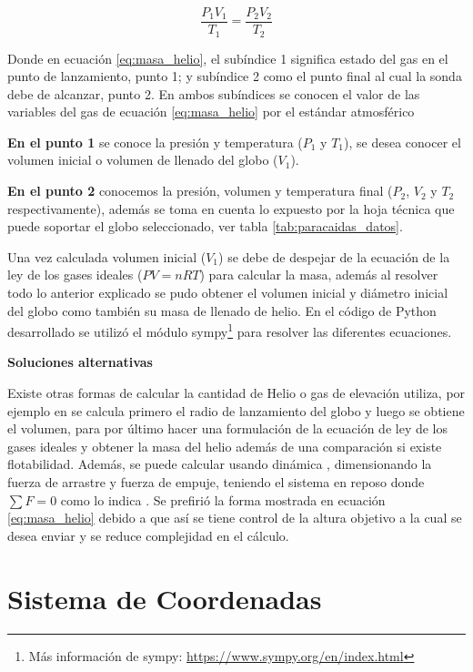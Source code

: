 \begin{equation}
    \label{eq:masa_helio}
    \frac{P_{1} V_{1}}{ T_{1} } = \frac{P_{2} V_{2}}{ T_{2} }
\end{equation}


Donde en ecuación \ref{eq:masa_helio}, el subíndice 1 significa estado del gas en el punto de lanzamiento, punto 1; y subíndice 2 como el punto final al cual la sonda debe de alcanzar, punto 2. En ambos subíndices se conocen el valor de las variables del gas de ecuación \ref{eq:masa_helio} por el estándar  atmosférico \cite{isa_1976}

\textbf{En el punto 1} se conoce la presión y temperatura ($P_{1}$ y $T_{1}$), se desea conocer el volumen inicial o volumen de llenado del globo ($V_{1}$).

\textbf{En el punto 2} conocemos la presión, volumen y temperatura final ($P_{2}$, $V_{2}$ y $T_{2}$ respectivamente), además se toma en cuenta lo expuesto por la hoja técnica que puede soportar el globo seleccionado, ver tabla \ref{tab:paracaidas_datos}. 

Una vez calculada volumen inicial ($V_{1}$) se debe de despejar de la ecuación de la ley de los gases ideales ($PV = nRT$) para calcular la masa, además al resolver todo lo anterior explicado se pudo obtener el volumen inicial y diámetro inicial del globo como también su masa de llenado de helio. En el código de Python desarrollado se utilizó el módulo sympy\footnote{Más información de sympy: \url{https://www.sympy.org/en/index.html}} para resolver las diferentes ecuaciones. 

\textbf{Soluciones alternativas}

Existe otras formas de calcular la cantidad de Helio o gas de elevación utiliza, por ejemplo  en \cite{spain_simulador} se calcula primero el radio de lanzamiento del globo y  luego se obtiene el volumen, para por último hacer una formulación de la ecuación de ley de los gases ideales y obtener la masa del helio además de una comparación si existe flotabilidad. Además, se puede calcular usando dinámica \cite{libro_dinamica_beer},  dimensionando la fuerza de arrastre y fuerza de empuje, teniendo el sistema en reposo donde $\sum F = 0$  como lo indica \cite{lsoda, helio_estimatcion} . Se prefirió la forma mostrada en ecuación \ref{eq:masa_helio} debido a que así se tiene control de la altura objetivo a la cual se desea enviar y se reduce complejidad en el cálculo. 

\newpage

\section{Sistema de Coordenadas}

